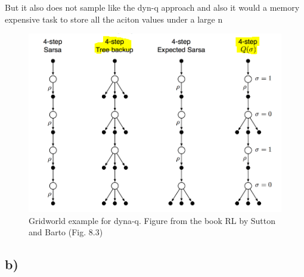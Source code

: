 \documentclass[a4paper]{article}
\begin{document}
But it also does not sample like the dyn-q approach and also it would a memory expensive task to store all the aciton values under a large n
\begin{figure}[!h]
	\centering
	\includegraphics[width=0.6\linewidth]{tree-backup_Q-omega} 
	\caption{Gridworld example for dyna-q. Figure from the book RL by Sutton and Barto (Fig. 8.3)}
	\label{fig:n-step_sarsa}
\end{figure}
    	\subsection*{b)} 
\end{document}
